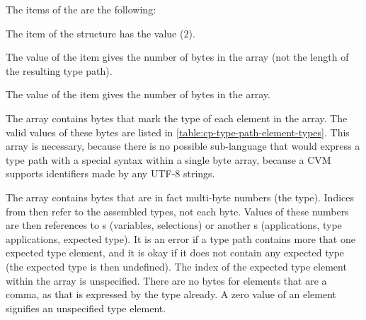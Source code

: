 The items of the  are the following:
\begin{description}[font=\ttfamily\mdseries,style=nextline]
  \item[tag]
  The  item of the  structure has the value  ($2$). 
  \item[length]
  The value of the  item gives the number of bytes in the  array (not the length of the resulting type path).
  \item[element\_count]
  The value of the  item gives the number of bytes in the  array.
  \item[element\_types]
  The  array contains bytes that mark the type of each element in the  array. The valid values of these bytes are listed in \autoref{table:cp-type-path-element-types}. This array is necessary, because there is no possible sub-language that would express a type path with a special syntax within a single byte array, because a CVM supports identifiers made by any \mbox{UTF-8} strings. 
  \item[elements]
  The  array contains bytes that are in fact multi-byte numbers (the  type). Indices from  then refer to the assembled  types, not each byte. Values of these numbers are then references to s (variables, selections) or another s (applications, type applications, expected type). It is an error if a type path contains more that one expected type element, and it is okay if it does not contain any expected type (the expected type is then undefined). The index of the expected type element within the  array is unspecified. There are no bytes for elements that are a comma, as that is expressed by the type already. A zero value of an element signifies an unspecified type element. 
\end{description}


